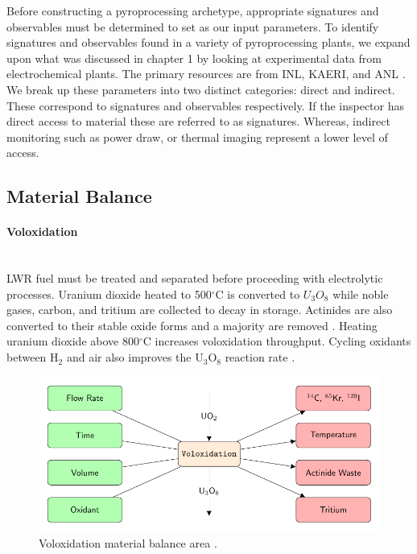 Before constructing a pyroprocessing archetype, appropriate signatures and observables must be determined to set as our input parameters. To identify signatures and observables 
found in a variety of pyroprocessing plants, we expand upon what was discussed in chapter 1 by looking at experimental data from electrochemical plants. The primary resources are from 
INL, KAERI, and ANL \cite{lee_korean_2011,flowsheet_1998,michael_f._simpson_developments_2012,li_electrorefining_2005}. We break up these parameters into two distinct categories: direct and indirect. These correspond to signatures and observables respectively. If the inspector has direct access to material these are referred to as signatures. Whereas, indirect monitoring such as
power draw, or thermal imaging represent a lower level of access. 

\subsection{Material Balance}
\paragraph{Voloxidation} \mbox{}\\
\gls{LWR} fuel must be treated and separated before proceeding with electrolytic processes. Uranium dioxide heated to 
500$^{\circ}$C is converted to $U_3O_8$ while noble gases, carbon, and tritium are collected to decay in storage. 
Actinides are also converted to their stable oxide forms and a majority are removed \cite{flowsheet_1998,jubin_spent_2009}. 
Heating uranium dioxide above 800$^{\circ}$C increases voloxidation throughput.
Cycling oxidants between H$_2$ and air also improves the U$_3$O$_8$ reaction rate \cite{jubin_spent_2009}.

\begin{figure}[h]
	\centering
	\includegraphics[width=0.9\linewidth]{images/volox}
	\caption{Voloxidation material balance area \cite{jubin_spent_2009}.}
	\label{fig:volox}
\end{figure}

